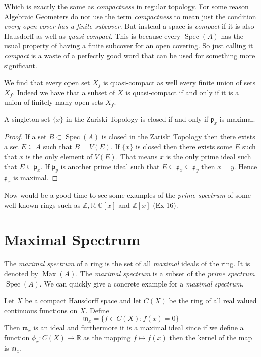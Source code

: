 \documentclass[]{report}
\DeclareMathOperator\Spec{Spec}
\DeclareMathOperator\Max{Max}
\begin{document}
    Which is exactly the same as \textit{compactness} in regular topology. For some reason Algebraic Geometers do not use the term \textit{compactness} to mean just the condition \textit{every open cover has a finite subcover}. But instead a space is \textit{compact} if it is also Hausdorff as well as \textit{quasi-compact}. This is because every $\Spec(A)$ has the usual property of having a finite subcover for an open covering. So just calling it \textit{compact} is a waste of a perfectly good word that can be used for something more significant. 

    We find that every open set $X_f$ is quasi-compact as well every finite union of sets $X_f$. Indeed we have that a subset of $X$ is quasi-compact if and only if it is a union of finitely many open sets $X_f$.

    A singleton set $\{x\}$ in the Zariski Topology is closed if and only if $\mathfrak{p}_x$ is maximal.
\begin{proof}
    If a set $B \subset \Spec(A)$ is closed in the Zariski Topology then there exists a set $E \subseteq A$ such that $B = V(E)$. If $\{x\}$ is closed then there exists some $E$ such that $x$ is the only element of $V(E)$. That means $x$ is the only prime ideal such that $E \subseteq \mathfrak{p}_x$. If $\mathfrak{p}_y$ is another prime ideal such that $E \subseteq \mathfrak{p}_x \subseteq \mathfrak{p}_y$ then $x = y$. Hence $\mathfrak{p}_x$ is maximal.
\end{proof}

    Now would be a good time to see some examples of the \textit{prime spectrum} of some well known rings such as $\mathbb{Z, R, C}[x]$ and $\mathbb{Z}[x]$ (Ex 16).



\section{Maximal Spectrum}

The \textit{maximal spectrum} of a ring is the set of all \textit{maximal} ideals of the ring. It is denoted by $\Max(A)$. The \textit{maximal spectrum} is a subset of the \textit{prime spectrum} $\Spec(A)$. We can quickly give a concrete example for a \textit{maximal spectrum}.

Let $X$ be a compact Hausdorff space and let $C(X)$ be the ring of all real valued continuous functions on $X$. Define
$$\mathfrak{m}_x = \{f\in C(X): f(x) = 0\}$$
Then $\mathfrak{m}_x$ is an ideal and furthermore it is a maximal ideal since if we define a function $\phi_x: C(X) \rightarrow \mathbb{R}$ as the mapping $f\mapsto f(x)$ then the kernel of the map is $\mathfrak{m}_x$. 
\end{document}
